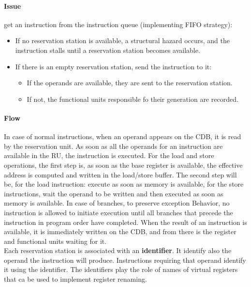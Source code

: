 \documentclass[12pt]{article}
\begin{document}
\paragraph{Issue} get an instruction from the instruction queue (implementing FIFO strategy):
\begin{itemize}
  \item If no reservation station is available, a structural hazard occurs, and the instruction stalls until a reservation station becomes available.
  \item If there is an empty reservation station, send the instruction to it:
  \begin{itemize}
    \item If the operands are available, they are sent to the reservation station.
    \item If not, the functional units responsible fo their generation are recorded.
  \end{itemize}
\end{itemize}

\paragraph{Flow} In case of normal instructions, when an operand appears on the CDB, it is read by the reservation unit. As soon as all the operands for an instruction are available in the RU, the instruction is executed. For the load and store operations, the first step is, as soon as the base register is available, the effective address is computed and written in the load/store buffer. The second step will be, for the load instruction: execute as soon as memory is available, for the store instructions, wait the operand to be written and then executed as soon as memory is available. In case of branches, to preserve exception Behavior, no instruction is allowed to initiate execution until all branches that precede the instruction in program order have completed. When the result of an instruction is available, it is immediately written on the CDB, and from there is the register and functional units waiting for it.\\

Each reservation station is associated with an \textbf{identifier}. It identify also the operand the instruction will produce. Instructions requiring that operand identify it using the identifier. The identifiers play the role of names of virtual registers that ca be used to implement register renaming.
\end{document}
